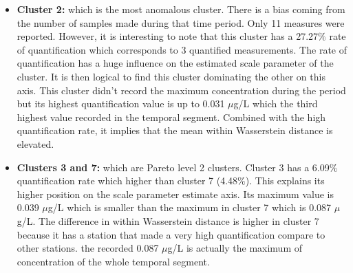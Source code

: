 \begin{itemize}
    \item \textbf{Cluster 2:} which is the most anomalous cluster. There is a bias coming from the number of samples made during that time period. Only 11 measures were reported. However, it is interesting to note that this cluster has a 27.27$\%$ rate of quantification which corresponds to 3 quantified measurements. The rate of quantification has a huge influence on the estimated scale parameter of the cluster. It is then logical to find this cluster dominating the other on this axis. This cluster didn't record the maximum concentration during the period but its highest quantification value is up to 0.031 $\mu$g/L which the third highest value recorded in the temporal segment. Combined with the high quantification rate, it implies that the mean within Wasserstein distance is elevated.  
    \item \textbf{Clusters 3 and 7:} which are Pareto level 2 clusters. Cluster 3 has a 6.09$\%$ quantification rate which higher than cluster 7 (4.48$\%$). This explains its higher position on the scale parameter estimate axis. Its maximum value is 0.039 $\mu$g/L which is smaller than the maximum in cluster 7 which is 0.087 $\mu$g/L. The difference in within Wasserstein distance is higher in cluster 7 because it has a station that made a very high quantification compare to other stations. the recorded 0.087 $\mu$g/L is actually the maximum of concentration of the whole temporal segment.
\end{itemize}

